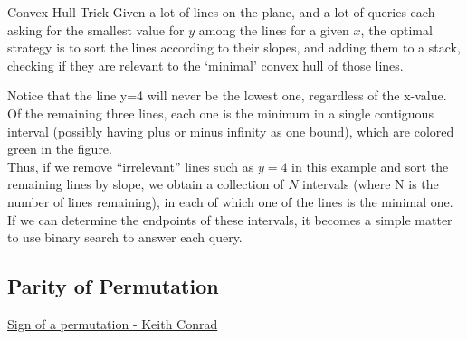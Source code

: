 {Convex Hull Trick}{
    Given a lot of lines on the plane, and a lot of queries each asking for
    the smallest value for $ y $ among the lines for a given $ x $, the
    optimal strategy is to sort the lines according to their slopes, and
    adding them to a stack, checking if they are relevant to the `minimal'
    convex hull of those lines.
}
\begin{minipage}{.55\linewidth}
    Notice that the line y=4 will never be the
    lowest one, regardless of the x-value. Of the remaining three lines, each
    one is the minimum in a single contiguous interval (possibly having plus
    or minus infinity as one bound), which are colored green in the figure.
    \\[1em]

    Thus, if we remove ``irrelevant'' lines such as $y=4$ in this example 
    and sort the remaining lines by slope, we obtain a collection of $N$ intervals
    (where N is the number of lines remaining), in each of which one of the lines
    is the minimal one. If we can determine the endpoints of these intervals, it
    becomes a simple matter to use binary search to answer each query.
\end{minipage}\hfill%
\begin{minipage}{.4\linewidth}
\end{minipage}



\newpage
\subsection{Parity of Permutation}

\begin{myitemize}
    \item \href{https://kconrad.math.uconn.edu/blurbs/grouptheory/sign.pdf}{Sign
        of a permutation - Keith Conrad}
\end{myitemize}


